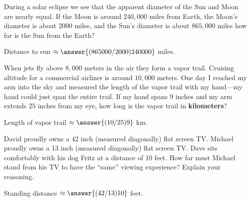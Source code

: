 \documentclass[nooutcomes]{ximera}
\begin{document}
\begin{question}
During a solar eclipse we see that the apparent diameter of the
  Sun and Moon are nearly equal. If the Moon is around $240,000$ miles
  from Earth, the Moon's diameter is about $2000$ miles, and the Sun's
  diameter is about $865,000$ miles how far is the Sun from the Earth?

Distance to sun $\approx \answer{(865000/2000)240000}$ miles. 
\end{question}

\begin{question}
When jets fly above $8,000$ meters in the air they form a vapor
  trail. Cruising altitude for a commercial airliner is around $10,000$
  meters. One day I reached my arm into the sky and measured the
  length of the vapor trail with my hand---my hand could just span the
  entire trail. If my hand spans $9$ inches and my arm extends $25$
  inches from my eye, how long is the vapor trail in \textbf{kilometers}? 

Length of vapor trail $\approx \answer{(10/25)9}$ km. 
\end{question}

\begin{question}
David proudly owns a 42 inch (measured diagonally) flat screen
  TV. Michael proudly owns a 13 inch (measured diagonally) flat screen
  TV. Dave sits comfortably with his dog Fritz at a distance of 10
  feet. How far must Michael stand from his TV to have the ``same''
  viewing experience?  Explain your reasoning.

Standing distance $\approx \answer{(42/13)10}$ feet.  
\end{question}
\end{document}
